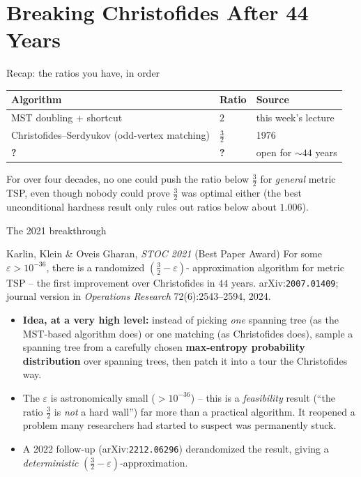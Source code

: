 \documentclass[11pt,aspectratio=169]{beamer}
\begin{document}
\section{Breaking Christofides After 44 Years}

\begin{frame}{Recap: the ratios you have, in order}
  \begin{center}
  \begin{tabular}{@{}lll@{}}
    \toprule
    Algorithm & Ratio & Source \\
    \midrule
    MST doubling + shortcut & $2$ & this week's lecture \\
    Christofides--Serdyukov (odd-vertex matching) & $\tfrac{3}{2}$ & 1976 \\
    \textbf{?} & \textbf{?} & open for $\sim\!44$ years \\
    \bottomrule
  \end{tabular}
  \end{center}
  For over four decades, no one could push the ratio below $\tfrac32$ for \emph{general}
  metric TSP, even though nobody could prove $\tfrac32$ was optimal either (the best
  unconditional hardness result only rules out ratios below about $1.006$).
\end{frame}

\begin{frame}{The 2021 breakthrough}
  \begin{block}{Karlin, Klein \& Oveis Gharan, \emph{STOC 2021} (Best Paper Award)}
    For some $\varepsilon > 10^{-36}$, there is a randomized $(\tfrac32-\varepsilon)$-
    approximation algorithm for metric TSP -- the first improvement over Christofides in
    $44$ years. arXiv:\texttt{2007.01409}; journal version in \emph{Operations Research}
    72(6):2543--2594, 2024.
  \end{block}
  \begin{itemize}
    \item \textbf{Idea, at a very high level:} instead of picking \emph{one} spanning
    tree (as the MST-based algorithm does) or one matching (as Christofides does), sample
    a spanning tree from a carefully chosen \textbf{max-entropy probability
    distribution} over spanning trees, then patch it into a tour the Christofides way.
    \item The $\varepsilon$ is astronomically small ($>10^{-36}$) -- this is a
    \emph{feasibility} result (``the ratio $\tfrac32$ is \emph{not} a hard wall'') far
    more than a practical algorithm. It reopened a problem many researchers had started
    to suspect was permanently stuck.
    \item A 2022 follow-up (arXiv:\texttt{2212.06296}) derandomized the result, giving a
    \emph{deterministic} $(\tfrac32-\varepsilon)$-approximation.
  \end{itemize}
\end{frame}
\end{document}
